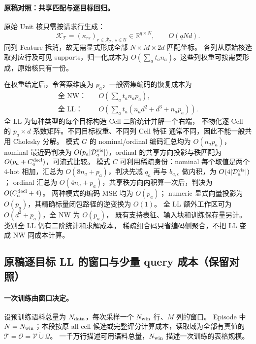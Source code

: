 \documentclass[11pt,UTF8,fontset=fandol]{ctexart}
\numberwithin{equation}{section}
\theoremstyle{definition}
\newcommand{\Rset}{\mathcal U}
\newcommand{\Oset}{\mathcal O}
\newcommand{\Vset}{\mathcal V}
\newcommand{\Qset}{\mathcal Q}
\newcommand{\TargetSet}{\mathcal T}
\newcommand{\R}{\mathbb R}
\begin{document}
\paragraph{原稿对照：共享匹配与逐目标回归。}
原始 Unit 核只需按请求行生成：
\begin{equation}
 \mathcal K_{\TargetSet}=(\kappa_{rs})_
       {r\in\mathcal R_{\TargetSet},\,s\in\Rset}\in\R^{q\times N},
 \qquad O(qNd).
 \label{eq:cost:matching}
\end{equation}
同列 Feature 抵消，故无需显式形成全部 $N\times M\times2d$ 匹配坐标。
各列从原始核选取对应行及可见 supports，归一化成本为
$O(\sum_a t_an_a)$。这些列权重可按需要形成，原始核只有一份。

在权重给定后，令答案维度为 $p_a$，一般密集编码的恢复成本为
\begin{equation}
 \begin{aligned}
 \text{全 NW：}&\quad O\!\left(\sum_a t_a n_a p_a\right),\\
 \text{全 LL：}&\quad O\!\left(\sum_a t_a(n_a d^2+d^3+n_a p_a)\right).
 \end{aligned}
 \label{eq:cost:ll}
\end{equation}
全 LL 为每种类型的每个目标构造 Cell 二阶统计并解一个右端，
不物化逐 Cell 的 $p_a\times d$ 系数矩阵。不同目标权重、不同列 Cell 特征
通常不同，因此不能一般共用 Cholesky 分解。
模式 $G$ 的 nominal/ordinal 编码汇总均为 $O(n_ap_a)$，
nominal 最近码判决为 $O(p_a|\mathcal D_a^{\rm vis}|)$，ordinal 的共享方向投影与秩匹配为 $O(p_a+C_a^{\rm decl})$，可流式比较。
模式 $C$ 可利用稀疏身份：nominal 每个取值是两个 $4$-hot 相加，汇总为 $O(8n_a+p_a)$，判决先减 $q_a$ 再与 $b_{a,c}$ 做内积，为 $O(4|\mathcal D_a^{\rm vis}|)$；
ordinal 汇总为 $O(4n_a+p_a)$，共享秩方向内积算一次后，判决为 $O(C_a^{\rm decl}+4)$。
两种模式的编码 MSE 均为 $O(p_a)$；
numeric 显式向量投影为 $O(p_a)$，其精确标量闭包路径的逆变换为 $O(1)$。
全 LL 额外工作区可为 $O(d^2+p_a)$，全 NW 为 $O(p_a)$，
既有支持表征、输入块和训练保存量另计。类别全 LL 仍有二阶统计和求解成本，
稀疏组合码只省编码侧聚合，不把 LL 变成 NW 同成本计算。

\subsection{原稿逐目标 LL 的窗口与少量 query 成本（保留对照）}
\label{subsec:cost:window-memory}

\paragraph{一次训练由窗口决定。}
设预训练语料总量为 $N_{\rm data}$，每次采样一个 $N_{\rm win}$ 行、$M$ 列的窗口。
Episode 中 $N=N_{\rm win}$；本段按原 all-cell 候选或完整评分计算成本，读取域为全部有真值的
$\TargetSet=\Oset=\Vset\mathbin{\dot\cup}\Qset$。
一千万行描述可用语料总量，$N_{\rm win}$ 描述一次训练的表格规模。
\end{document}
